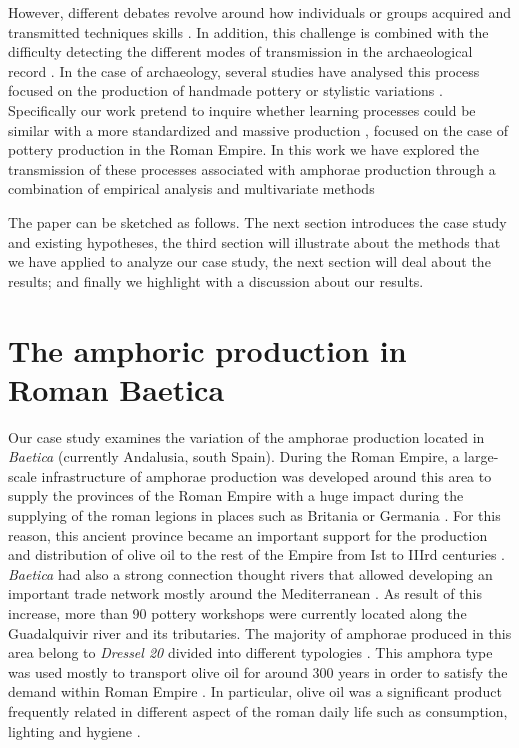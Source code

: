 \documentclass[review]{elsarticle}
\begin{document}
However, different debates revolve around how individuals or groups acquired and transmitted techniques skills  \citep{bowser_learning_2008, mesoudi_cultural_2008}. In addition, this challenge is combined with the difficulty detecting the different modes of transmission in the archaeological record \citep{roux_standardization_2015}. In the case of archaeology, several studies have analysed this process focused on the production of handmade pottery \citep{steele_james_ceramic_2010} or stylistic variations \citep{neiman_stylistic_1995, shennan_ceramic_2001}. Specifically our work pretend to inquire whether learning processes could be similar with a more standardized and massive production \citep{gandon_copying_2014}, focused on the case of pottery production in the Roman Empire. In this work we have explored the transmission of these processes associated with amphorae production through a combination of empirical analysis and multivariate methods
                     
The paper can be sketched as follows. The next section introduces the case study and existing hypotheses, the third section will illustrate about the methods that we have applied to analyze our case study, the next section will deal about the results; and finally we highlight with a discussion about our results.  


\section{The amphoric production in Roman Baetica}

Our case study examines the variation of the amphorae production located in \emph{Baetica} (currently Andalusia, south Spain). During the Roman Empire, a large-scale infrastructure of amphorae production was developed around this area to supply the provinces of the Roman Empire with a huge impact during the supplying of the roman legions in places such as Britania \citep{funari_economic_2005, monfort_britannia_1998} or Germania \citep{remesal_annona_1986}. For this reason, this ancient province became an important support for the production and distribution of olive oil to the rest of the Empire from Ist to IIIrd centuries \cite{chic_comercio_2005,millet_anforas_1998, rodriguez_baetican_1998}. \emph{Baetica} had also a strong connection thought rivers that allowed developing an important trade network mostly around the Mediterranean \citep{garcia_vargas_enrique_formal_2010}. As result of this increase, more than 90 pottery workshops were currently located along the Guadalquivir river and its tributaries. The majority of amphorae produced in this area belong to \emph{Dressel 20} divided into different typologies \citep{berni_millet_epigrafianforica_2008, martin-kilcher_romischen_1994}. This amphora type was used mostly to transport olive oil for around 300 years in order to satisfy the demand within Roman Empire \citep{rodriguez_economioleicola_1977}. In particular, olive oil was a significant product frequently related in different aspect of the roman daily life such as consumption, lighting and hygiene \citep{mattingly_d.j._oil_1988}. 
\end{document}
